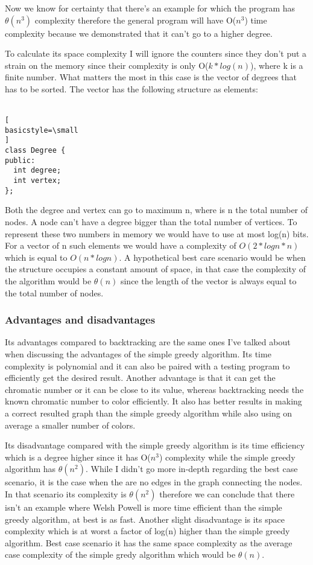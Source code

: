 \documentclass[runningheads]{llncs}
\begin{document}
Now we know for certainty that there's an example for which the program has $\theta(n^3)$ complexity
therefore the general program will have O($n^3$) time complexity because we demonstrated that
it can't go to a higher degree.

To calculate its space complexity I will ignore the counters since they don't put a strain on the memory
since their complexity is only O($k * log(n)$), where k is a finite number. What matters the most in
this case is the vector of degrees that has to be sorted. The vector has the following structure as
elements:
\\
\\
\begin{lstlisting}[
basicstyle=\small
]
class Degree {
public:
  int degree;
  int vertex;
};
\end{lstlisting}

Both the degree and vertex can go to maximum n, where is n the total number of nodes. A node
can't have a degree bigger than the total number of vertices. To represent these two numbers
in memory we would have to use at most log(n) bits. For a vector of n such elements we would have a
complexity of $O(2*logn*n)$ which is equal to $O(n*logn)$. A hypothetical best care scenario would
be when the structure occupies a constant amount of space, in that case the complexity of the
algorithm would be $\theta(n)$ since the length of the vector is always equal to the total number of
nodes.

\subsubsection{Advantages and disadvantages}
Its advantages compared to backtracking are the same ones I've talked about when discussing the advantages
of the simple greedy algorithm. Its time complexity is polynomial and it can also be paired with a testing
program to efficiently get the desired result. Another advantage is that it can get the chromatic number
or it can be close to its value, whereas backtracking needs the known chromatic number to color
efficiently. It also has better results in making a correct resulted graph than the simple greedy algorithm while
also using on average a smaller number of colors.

Its disadvantage compared with the simple greedy algorithm is its time efficiency which is a degree higher since
it has O($n^3$) complexity while the simple greedy algorithm has $\theta(n^2)$. While I didn't go more in-depth regarding
the best case scenario, it is the case when the are no edges in the graph connecting the nodes. In that
scenario its complexity is $\theta(n^2)$ therefore we can conclude that there isn't an example where
Welsh Powell is more time efficient than the simple greedy algorithm, at best is as fast. Another slight disadvantage 
is its space complexity which is at worst a factor of log(n) higher than the simple greedy algorithm. Best
case scenario it has the same space complexity as the average case complexity of the simple gredy algorithm which
would be $\theta(n)$.
\end{document}
